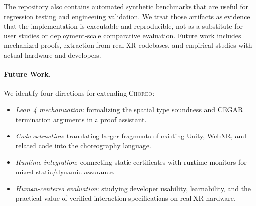 \documentclass[11pt,a4paper]{article}
\begin{document}
The repository also contains automated synthetic benchmarks that are
useful for regression testing and engineering validation.  We treat
those artifacts as evidence that the implementation is executable and
reproducible, not as a substitute for user studies or deployment-scale
comparative evaluation.  Future work includes mechanized proofs,
extraction from real XR codebases, and empirical studies with actual
hardware and developers.

\paragraph{Future Work.}
We identify four directions for extending \textsc{Choreo}:
\begin{itemize}
\item \emph{Lean~4 mechanization}: formalizing the spatial type
  soundness and CEGAR termination arguments in a proof assistant.
\item \emph{Code extraction}: translating larger fragments of existing
  Unity, WebXR, and related code into the choreography language.
\item \emph{Runtime integration}: connecting static certificates with
  runtime monitors for mixed static/dynamic assurance.
\item \emph{Human-centered evaluation}: studying developer usability,
  learnability, and the practical value of verified interaction
  specifications on real XR hardware.
\end{itemize}


\end{document}
